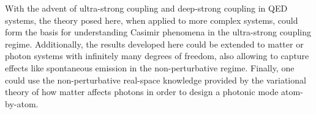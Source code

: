 \documentclass[aps,prl,twocolumn,
	groupedaddress,superscriptaddress,
	amsfonts,amssymb,amsmath,floatfix,
	citeautoscript]{revtex4-1}
\newcommand{\Jadd}[1]{\textcolor{blue}{#1}}
\begin{document}
With the advent of ultra-strong coupling and deep-strong coupling in QED systems, the theory posed here, when applied to more complex systems, could form the basis for understanding Casimir phenomena in the ultra-strong coupling regime. Additionally, the results developed here could be extended to matter  or photon systems with infinitely many degrees of freedom, also allowing to capture effects like spontaneous emission in the non-perturbative regime. Finally, one could use the non-perturbative real-space knowledge provided by the variational theory of how matter affects photons in order to design a photonic mode atom-by-atom.


%
\end{document}
